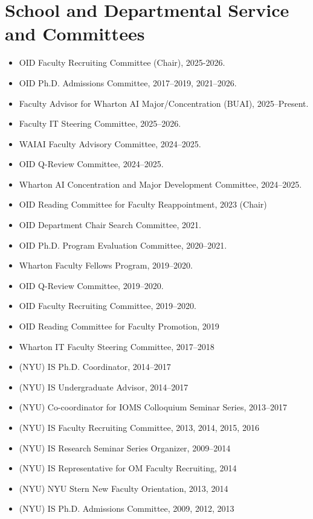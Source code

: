 \documentclass[10pt,letterpaper]{article}
\begin{document}
\section*{School and Departmental Service and Committees}
\begin{itemize}
\item  OID Faculty Recruiting Committee (Chair), 2025-2026.
\item  OID Ph.D. Admissions Committee, 2017--2019, 2021--2026.
\item  Faculty Advisor for Wharton AI Major/Concentration (BUAI), 2025--Present.
\item  Faculty IT Steering Committee, 2025--2026.
\item  WAIAI Faculty Advisory Committee, 2024--2025.
\item  OID Q-Review Committee, 2024--2025.
\item  Wharton AI Concentration and Major Development Committee, 2024--2025.
\item  OID Reading Committee for Faculty Reappointment, 2023 (Chair)
\item  OID Department Chair Search Committee, 2021.
\item  OID Ph.D. Program Evaluation Committee, 2020--2021.
\item  Wharton Faculty Fellows Program, 2019--2020.
\item  OID Q-Review Committee, 2019--2020.
\item  OID Faculty Recruiting Committee, 2019--2020.
\item  OID Reading Committee for Faculty Promotion, 2019
\item  Wharton IT Faculty Steering Committee, 2017--2018
\item  (NYU) IS Ph.D. Coordinator, 2014--2017
\item  (NYU) IS Undergraduate Advisor, 2014--2017
\item  (NYU) Co-coordinator for IOMS Colloquium Seminar Series, 2013--2017
\item  (NYU) IS Faculty Recruiting Committee, 2013, 2014, 2015, 2016
\item  (NYU) IS Research Seminar Series Organizer, 2009--2014
\item  (NYU) IS Representative for OM Faculty Recruiting, 2014
\item  (NYU) NYU Stern New Faculty Orientation, 2013, 2014
\item  (NYU) IS Ph.D. Admissions Committee, 2009, 2012, 2013
\end{itemize}
\end{document}
